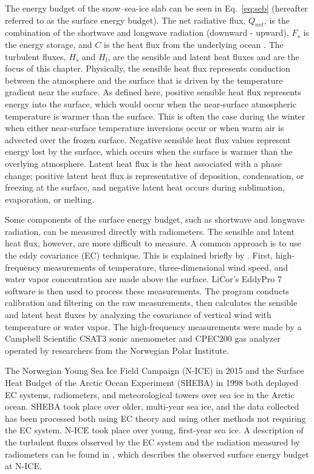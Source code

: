 The energy budget of the snow--sea-ice slab can be seen in Eq.~\ref{eq:seb} (hereafter referred to as the surface energy budget). The net radiative flux, $Q_{net}$, is the combination of the shortwave and longwave radiation (downward - upward), $F_{s}$ is the energy storage, and $C$ is the heat flux from the underlying ocean \citep{walden:2017}. The turbulent fluxes, $H_{s}$ and $H_{l}$, are the sensible and latent heat fluxes and are the focus of this chapter. Physically, the sensible heat flux represents conduction between the atmosphere and the surface that is driven by the temperature gradient near the surface. As defined here, positive sensible heat flux represents energy into the surface, which would occur when the near-surface atmospheric temperature is warmer than the surface. This is often the case during the winter when either near-surface temperature inversions occur or when warm air is advected over the frozen surface. Negative sensible heat flux values represent energy lost by the surface, which occurs when the surface is warmer than the overlying atmosphere. Latent heat flux is the heat associated with a phase change; positive latent heat flux is representative of deposition, condensation, or freezing at the surface, and negative latent heat occurs during sublimation, evaporation, or melting.

Some components of the surface energy budget, such as shortwave and longwave radiation, can be measured directly with radiometers. The sensible and latent heat flux, however, are more difficult to measure. A common approach is to use the eddy covariance (EC) technique. This is explained briefly by \citet{walden:2017}. First, high-frequency measurements of temperature, three-dimensional wind speed, and water vapor concentration are made above the surface. LiCor's EddyPro 7 \citep{epro} software is then used to process these measurements. The program conducts calibration and filtering on the raw measurements, then calculates the sensible and latent heat fluxes by analyzing the covariance of vertical wind with temperature or water vapor. The high-frequency measurements were made by a Campbell Scientific CSAT3 sonic anemometer and CPEC200 gas analyzer operated by researchers from the Norwegian Polar Institute. 

The Norwegian Young Sea Ice Field Campaign (N-ICE) in 2015 and the Surface Heat Budget of the Arctic Ocean Experiment (SHEBA) in 1998 both deployed EC systems, radiometers, and meteorological towers over sea ice in the Arctic ocean. SHEBA took place over older, multi-year sea ice, and the data collected has been processed both using EC theory and using other methods not requiring the EC system. N-ICE took place over young, first-year sea ice. A description of the turbulent fluxes observed by the EC system and the radiation measured by radiometers can be found in \citet{walden:2017}, which describes the observed surface energy budget at N-ICE. 

